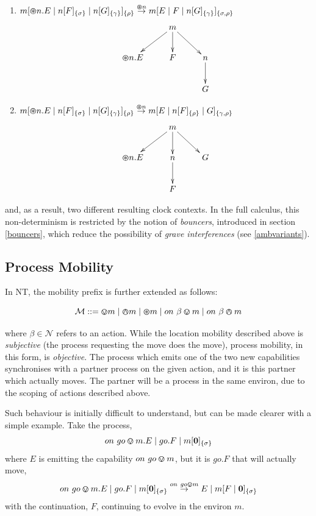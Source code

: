 \begin{enumerate}
\item
      ${m}[ \varoast n.E\;|\;{n}[ F ]_{\{\sigma\}}\;|\;{n}[ G ]_{\{\gamma\}} ]_{\{\rho\}}
      \stackrel{\varoast n}{\rightarrow} {m}[ E \;|\; F \;|\;
      {n}[ G ]_{\{\gamma\}} ]_{\{\sigma , \rho\}}$ \\
\[\CompileMatrices
\xymatrix{
&
m \ar@{->}[ld] \ar@{->}[d] \ar@{->}[rd] & \\
\tntopen{n}.E & F & n \ar@{->}[d] \\
& & G
}
\]
\item
      ${m}[ \varoast n.E\;|\;{n}[ F ]_{\{\sigma\}}\;|\;{n}[ G ]_{\{\gamma\}} ]_{\{\rho\}}
      \stackrel{\varoast n}{\rightarrow} {m}[ E \;|\; {n}[ F ]_{\{\rho\}} \;|\; G ]_{\{\gamma , \rho\}}$ \\
\[\CompileMatrices
\xymatrix{
&
m \ar@{->}[ld] \ar@{->}[d] \ar@{->}[rd] & \\
\tntopen{n}.E & n \ar@{->}[d] & G \\
& F & 
}
\]
\end{enumerate}
and, as a result, two different resulting clock contexts.  In the full
calculus, this non-determinism is restricted by the notion of
\emph{bouncers}, introduced in section \ref{bouncers}, which reduce
the possibility of \emph{grave interferences} (see \ref{ambvariants}).

\subsection{Process Mobility}
\label{procmob}

In NT, the mobility prefix is further extended as follows:

\begin{equation}
   \text{$\mathcal{M}$} \mathrel{::=} \varovee m \mid \varowedge m \mid \varoast m 
      \mid on\ \beta \varovee m \mid on\ \beta \varowedge m
\end{equation}

\noindent where $\beta \in \mathcal{N}$ refers to an action.  While
the location mobility described above is \emph{subjective} (the
process requesting the move does the move), process mobility, in this
form, is \emph{objective}.  The process which emits one of the two new
capabilities synchronises with a partner process on the given action,
and it is this partner which actually moves.  The partner will be a
process in the same environ, due to the scoping of actions described
above.

Such behaviour is initially difficult to understand, but can be made
clearer with a simple example.  Take the process,
\begin{equation}
on\ go \varovee m.E \;|\; go.F \;|\; {m}[ \textbf{0} ]_{\{\sigma\}}
\end{equation}
\noindent where $E$ is emitting the capability $on\ go \varovee m$, but it
is $go.F$ that will actually move,
\begin{equation}
on\ go \varovee m.E \;|\; go.F \;|\; {m}[ \textbf{0} ]_{\{\sigma\}} \stackrel{on\ go \varovee m}{\rightarrow}
E \;|\; {m}[ F \;|\; \textbf{0} ]_{\{\sigma\}}
\end{equation}
with the continuation, $F$, continuing to evolve in the environ $m$.   

